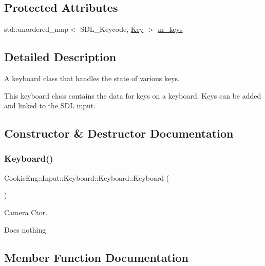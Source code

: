 \subsection*{Protected Attributes}
\begin{DoxyCompactItemize}
\item 
std\+::unordered\+\_\+map$<$ S\+D\+L\+\_\+\+Keycode, \hyperlink{class_cookie_eng_1_1_input_1_1_keyboard_1_1_key}{Key} $>$ \hyperlink{class_cookie_eng_1_1_input_1_1_keyboard_1_1_keyboard_a6b77b43567c775186e151a6fcfeea502}{m\+\_\+keys}
\end{DoxyCompactItemize}


\subsection{Detailed Description}
A keyboard class that handles the state of various keys. 

This keyboard class contains the data for keys on a keyboard. Keys can be added and linked to the S\+DL input. 

\subsection{Constructor \& Destructor Documentation}
\mbox{\label{class_cookie_eng_1_1_input_1_1_keyboard_1_1_keyboard_a65d004a6431f3fba5e79c67d677a01cd}} 
\subsubsection{\texorpdfstring{Keyboard()}{Keyboard()}}
{\footnotesize\ttfamily Cookie\+Eng\+::\+Input\+::\+Keyboard\+::\+Keyboard\+::\+Keyboard (\begin{DoxyParamCaption}{ }\end{DoxyParamCaption})}



Camera Ctor. 

Does nothing 

\subsection{Member Function Documentation}
\mbox{\label{class_cookie_eng_1_1_input_1_1_keyboard_1_1_keyboard_a27da39b7745ef5953465db0159ae876a}} 
